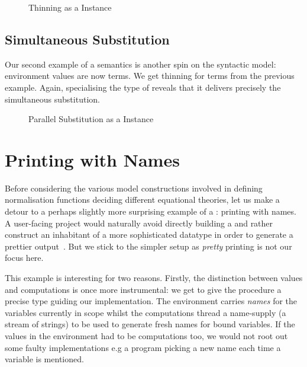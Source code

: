 \begin{figure}[h]
\caption{Thinning as a  Instance\label{fig:synren}}
\end{figure}

\subsection{Simultaneous Substitution}

Our second example of a semantics is another spin on the syntactic model:
environment values are now terms. We get thinning for terms from the
previous example. Again, specialising the type of 
reveals that it delivers precisely the simultaneous substitution.

\begin{figure}[h]
\caption{Parallel Substitution as a  Instance\label{fig:synsub}}
\end{figure}

\section{Printing with Names}
\label{prettyprint}

Before considering the various model constructions involved in defining
normalisation functions deciding different equational theories, let us
make a detour to a perhaps slightly more surprising example of a
: printing with names. A user-facing project would naturally
avoid directly building a  and rather construct an inhabitant of
a more sophisticated datatype in order to generate a prettier output~\cite{hughes1995design,wadler2003prettier}.
But we stick to the simpler setup as \emph{pretty} printing is not our focus here.

This example is interesting for two reasons. Firstly, the distinction between
values and computations is once more instrumental: we get to give the procedure
a precise type guiding our implementation. The environment carries \emph{names}
for the variables currently in scope whilst the computations thread a name-supply
(a stream of strings) to be used to generate fresh names for bound variables.
If the values in the environment had to be computations too, we would not root
out some faulty implementations e.g a program picking a new name each time a
variable is mentioned.

